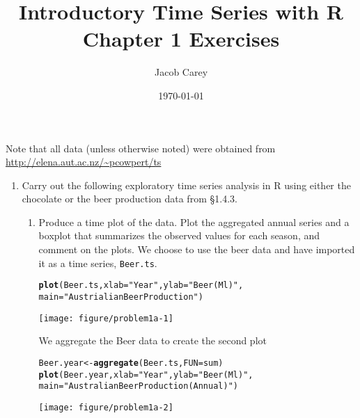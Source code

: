 \documentclass{article}\usepackage[]{graphicx}\usepackage[]{color}
\makeatletter
\newcommand{\hlstr}[1]{\textcolor[rgb]{0.192,0.494,0.8}{#1}}%
\newcommand{\hlstd}[1]{\textcolor[rgb]{0.345,0.345,0.345}{#1}}%
\newcommand{\hlkwb}[1]{\textcolor[rgb]{0.69,0.353,0.396}{#1}}%
\newcommand{\hlkwc}[1]{\textcolor[rgb]{0.333,0.667,0.333}{#1}}%
\newcommand{\hlkwd}[1]{\textcolor[rgb]{0.737,0.353,0.396}{\textbf{#1}}}%
\newenvironment{kframe}{%
 \def\at@end@of@kframe{}%
 \ifinner\ifhmode%
  \def\at@end@of@kframe{\end{minipage}}%
  \begin{minipage}{\columnwidth}%
 \fi\fi%
 \def\FrameCommand##1{\hskip\@totalleftmargin \hskip-\fboxsep
 \colorbox{shadecolor}{##1}\hskip-\fboxsep
     \hskip-\linewidth \hskip-\@totalleftmargin \hskip\columnwidth}%
 \MakeFramed {\advance\hsize-\width
   \@totalleftmargin\z@ \linewidth\hsize
   \@setminipage}}%
 {\par\unskip\endMakeFramed%
 \at@end@of@kframe}
\newenvironment{knitrout}{}{} %
\makeatother
\begin{document}
\title{Introductory Time Series with R \\ Chapter 1 Exercises}
\author{Jacob Carey}
\date{\today}
\maketitle


Note that all data (unless otherwise noted) were obtained from \\ \url{http://elena.aut.ac.nz/~pcowpert/ts}




\begin{enumerate}
\item Carry out the following exploratory time series analysis in R using either the chocolate or the beer production data from \S 1.4.3.
\begin{enumerate}
\item Produce a time plot of the data. Plot the aggregated annual series and a boxplot that summarizes the observed values for each season, and comment on the plots.
\newpage
We choose to use the beer data and have imported it as a time series, \texttt{Beer.ts}.
\begin{knitrout}
\color{fgcolor}\begin{kframe}
\begin{alltt}
\hlkwd{plot}\hlstd{(Beer.ts,} \hlkwc{xlab}\hlstd{=}\hlstr{"Year"}\hlstd{,} \hlkwc{ylab}\hlstd{=}\hlstr{"Beer (Ml)"}\hlstd{,}
     \hlkwc{main}\hlstd{=}\hlstr{"Austrialian Beer Production"}\hlstd{)}
\end{alltt}
\end{kframe}
\texttt{[image: figure/problem1a-1]} 

\end{knitrout}

\newpage
We aggregate the Beer data to create the second plot
\begin{knitrout}
\color{fgcolor}\begin{kframe}
\begin{alltt}
\hlstd{Beer.year} \hlkwb{<-} \hlkwd{aggregate}\hlstd{(Beer.ts,} \hlkwc{FUN}\hlstd{=sum)}
\hlkwd{plot}\hlstd{(Beer.year,} \hlkwc{xlab}\hlstd{=}\hlstr{"Year"}\hlstd{,} \hlkwc{ylab}\hlstd{=}\hlstr{"Beer (Ml)"}\hlstd{,}
     \hlkwc{main}\hlstd{=}\hlstr{"Australian Beer Production (Annual)"}\hlstd{)}
\end{alltt}
\end{kframe}
\texttt{[image: figure/problem1a-2]} 


\end{knitrout}
\end{enumerate}
\end{enumerate}
\end{document}
